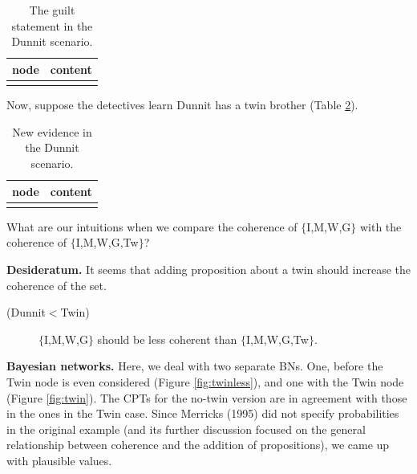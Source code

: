 \documentclass[
  10pt,
]{scrartcl}
\newcommand{\s}[1]{\textsf{#1}}
\begin{document}
\begin{table}[H]

\caption{\label{tab:dunnitPropositions2}The guilt statement in the Dunnit scenario.}
\centering
\begin{tabular}[t]{l>{\raggedright\arraybackslash}p{25em}}
\toprule
node & content\\
\midrule
\cellcolor{gray!6}{G} & \cellcolor{gray!6}{Dunnit is guilty.}\\
\bottomrule
\end{tabular}
\end{table}

\noindent Now, suppose the detectives learn Dunnit has a twin brother (Table \ref{tab:dunnitPropositions3}).

\begin{table}[H]

\caption{\label{tab:dunnitPropositions3}New evidence in the Dunnit scenario.}
\centering
\begin{tabular}[t]{l>{\raggedright\arraybackslash}p{25em}}
\toprule
node & content\\
\midrule
\cellcolor{gray!6}{Tw} & \cellcolor{gray!6}{Dunnit has an identical twin which was seen by the credible witness two hundred miles from the scene of the crime during the murder.}\\
\bottomrule
\end{tabular}
\end{table}

\noindent What are our intuitions when we compare the coherence of \(\{\)\s{I,M,W,G}\(\}\) with the coherence of \(\{\)\s{I,M,W,G,Tw}\(\}\)?

\vspace{1mm}

\noindent \textbf{Desideratum.} It seems that adding proposition about a twin should increase the coherence of the set.

\vspace{2mm}\begin{description}
    \item[(Dunnit$<$Twin)] $\{$\s{I,M,W,G}$\}$ should be less coherent than $\{$\s{I,M,W,G,Tw}$\}$. 
\end{description}\vspace{2mm}

\textbf{Bayesian networks.} Here, we deal with two separate BNs. One, before the \textsf{Twin} node is even considered (Figure \ref{fig:twinless}), and one with the \textsf{Twin} node (Figure \ref{fig:twin}). The CPTs for the no-twin version are in agreement with those in the ones in the Twin case. Since Merricks (1995) did not specify probabilities in the original example (and its further discussion focused on the general relationship between coherence and the addition of propositions), we came up with plausible values.
\end{document}
